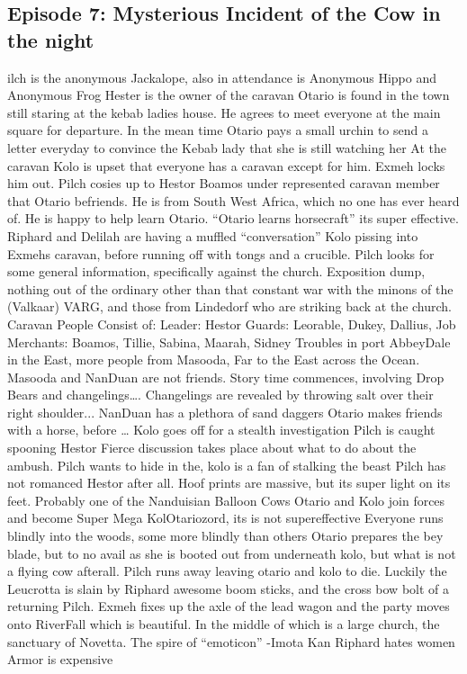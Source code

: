 \subsection{Episode 7: Mysterious Incident of the Cow in the night}
ilch is the anonymous Jackalope, also in attendance is Anonymous Hippo and Anonymous Frog\medskip
Hester is the owner of the caravan\medskip
Otario is found in the town still staring at the kebab ladies house. He agrees to meet everyone at the main square for departure. In the mean time Otario pays a small urchin to send a letter everyday to convince the Kebab lady that she is still watching her\medskip
At the caravan Kolo is upset that everyone has a caravan except for him. Exmeh locks him out. Pilch cosies up to Hestor\medskip
Boamos under represented caravan member that Otario befriends. He is from South West Africa, which no one has ever heard of. He is happy to help learn Otario. “Otario learns horsecraft” its super effective.\medskip
Riphard and Delilah are having a muffled “conversation”\medskip
Kolo pissing into Exmehs caravan, before running off with tongs and a crucible.\medskip
Pilch looks for some general information, specifically against the church. Exposition dump, nothing out of the ordinary other than that constant war with the minons of the (Valkaar) VARG, and those from Lindedorf who are striking back at the church.\medskip
Caravan People Consist of:\medskip
Leader: Hestor\medskip
Guards: Leorable, Dukey, Dallius, Job\medskip
Merchants: Boamos, Tillie, Sabina, Maarah, Sidney\medskip
Troubles in port AbbeyDale in the East, more people from Masooda, Far to the East across the Ocean. Masooda and NanDuan are not friends.\medskip
Story time commences, involving Drop Bears and changelings….\medskip
Changelings are revealed by throwing salt over their right shoulder...\medskip
NanDuan has a plethora of sand daggers\medskip
Otario makes friends with a horse, before …\medskip
Kolo goes off for a stealth investigation\medskip
Pilch is caught spooning Hestor\medskip
Fierce discussion takes place about what to do about the ambush. Pilch wants to hide in the, kolo is a fan of stalking the beast\medskip
Pilch has not romanced Hestor after all.\medskip
Hoof prints are massive, but its super light on its feet.\medskip
Probably one of the Nanduisian Balloon Cows\medskip
Otario and Kolo join forces and become Super Mega KolOtariozord, its is not supereffective\medskip
Everyone runs blindly into the woods, some more blindly than others\medskip
Otario prepares the bey blade, but to no avail as she is booted out from underneath kolo, but what is not a flying cow afterall.\medskip
Pilch runs away leaving otario and kolo to die. Luckily the Leucrotta is slain by Riphard awesome boom sticks, and the cross bow bolt of a returning Pilch.\medskip
Exmeh fixes up the axle of the lead wagon and the party moves onto RiverFall which is beautiful.\medskip
In the middle of which is a large church, the sanctuary of Novetta.\medskip
The spire of “emoticon” -Imota Kan\medskip
Riphard hates women\medskip
Armor is expensive